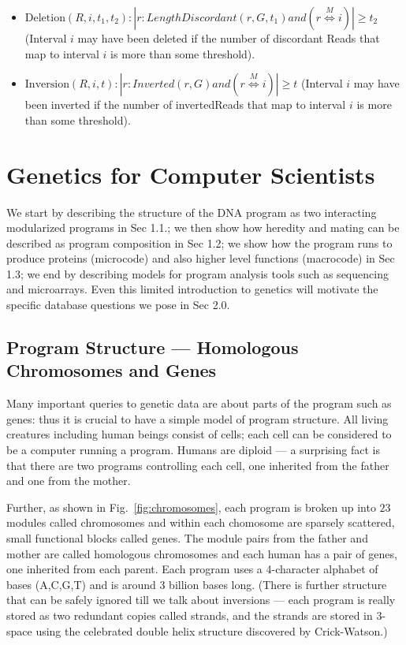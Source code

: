 \documentclass[10pt,fullpage]{article}
\newcommand{\MapRel}{\ensuremath{\stackrel{M}{\Leftrightarrow}}}
\begin{document}
\begin{itemize}
\item $\mbox{Deletion}(R,i,t_1, t_2):|r: LengthDiscordant(r,G,t_1)
and (r\MapRel i)|\ge t_2$
(Interval $i$ may have been deleted 
if the number of discordant {\sc Reads} that map to interval $i$ 
is more than some threshold).

\item $\mbox{Inversion}(R,i,t):|r: Inverted(r,G)
and (r\MapRel i)|\ge t$
(Interval $i$ may have been inverted
if the number of inverted{\sc Reads} that map to interval $i$ 
is more than some threshold).

\end{itemize} 





\newpage

\section{Genetics for Computer Scientists}
\label{sec:genetics}
We start by describing the structure of the DNA program as two
interacting modularized programs in Sec 1.1.; we then show how
heredity and mating can be described as program composition in Sec
1.2; we show how the program runs to produce proteins (microcode) and
also higher level functions (macrocode) in Sec 1.3; we end by
describing models for program analysis tools such as sequencing and
microarrays.  Even this limited introduction to genetics will motivate
the specific database questions we pose in Sec 2.0.

\subsection{Program Structure --- Homologous Chromosomes and Genes}
\label{sec:genes}
Many important queries to genetic data are about parts of the program
such as genes: thus it is crucial to have a simple model of program
structure.  All living creatures including human beings consist of
cells; each cell can be considered to be a computer running a program.
Humans are diploid --- a surprising fact is that there are two
programs controlling each cell, one inherited from the father and one
from the mother.

Further, as shown in Fig.~\ref{fig:chromosomes}, each program is
broken up into $23$ modules called chromosomes and within each
chomosome are sparsely scattered, small functional blocks called
genes.  The module pairs from the father and mother are called
homologous chromosomes and each human has a pair of genes, one
inherited from each parent.  Each program uses a 4-character alphabet
of bases (A,C,G,T) and is around 3 billion bases long.  (There is
further structure that can be safely ignored till we talk about
inversions --- each program is really stored as two redundant copies
called strands, and the strands are stored in 3-space using the
celebrated double helix structure discovered by Crick-Watson.)
\end{document}
